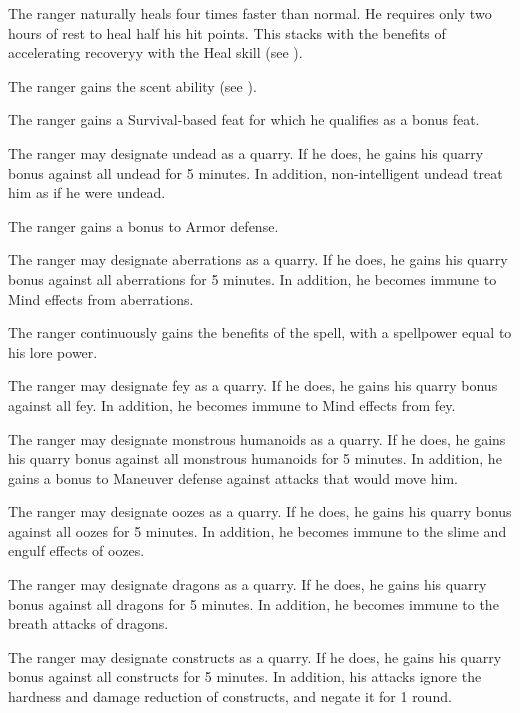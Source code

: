 The ranger naturally heals four times faster than normal.
He requires only two hours of rest to heal half his hit points.
This stacks with the benefits of accelerating recoveryy with the Heal skill (see ).

The ranger gains the scent ability (see ).

The ranger gains a Survival-based feat for which he qualifies as a bonus feat.

The ranger may designate undead as a quarry.
If he does, he gains his quarry bonus against all undead for 5 minutes.
In addition, non-intelligent undead treat him as if he were undead.

The ranger gains a  bonus to Armor defense.

The ranger may designate aberrations as a quarry.
If he does, he gains his quarry bonus against all aberrations for 5 minutes.
In addition, he becomes immune to Mind effects from aberrations.

The ranger continuously gains the benefits of the  spell, with a spellpower equal to his lore power.

The ranger may designate fey as a quarry.
If he does, he gains his quarry bonus against all fey.
In addition, he becomes immune to Mind effects from fey.

The ranger may designate monstrous humanoids as a quarry.
If he does, he gains his quarry bonus against all monstrous humanoids for 5 minutes.
In addition, he gains a  bonus to Maneuver defense against attacks that would move him.

The ranger may designate oozes as a quarry.
If he does, he gains his quarry bonus against all oozes for 5 minutes.
In addition, he becomes immune to the slime and engulf effects of oozes.

The ranger may designate dragons as a quarry.
If he does, he gains his quarry bonus against all dragons for 5 minutes.
In addition, he becomes immune to the breath attacks of dragons.

The ranger may designate constructs as a quarry.
If he does, he gains his quarry bonus against all constructs for 5 minutes.
In addition, his attacks ignore the hardness and damage reduction of constructs, and negate it for 1 round.

